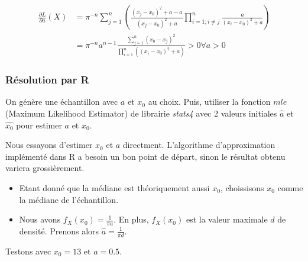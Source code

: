 \documentclass[12pt,a4paper,titlepage]{article}
\numberwithin{equation}{section}
\begin{document}
\begin{align*}
\frac{{\partial L}}{{\partial a}}\left( X \right) & = {\pi ^{ - n}}\sum\limits_{j = 1}^n {\left( {\frac{{{{\left( {{x_j} - {x_0}} \right)}^2} + a - a}}{{{{\left( {{x_j} - {x_0}} \right)}^2} + a}}\prod\limits_{i = 1;i \ne j}^n {\frac{a}{{{{\left( {{x_i} - {x_0}} \right)}^2} + a}}} } \right)}\\
&  = {\pi ^{ - n}}{a^{n - 1}}\frac{{\sum\limits_{j = 1}^n {{{\left( {{x_0} - {x_j}} \right)}^2}} }}{{\prod\limits_{i = 1}^n {\left( {{{\left( {{x_i} - {x_0}} \right)}^2} + a} \right)} }} > 0 \forall a > 0
\end{align*}

\subsubsection*{Résolution par R}

On génère une échantillon avec $a$ et $x_0$ au choix. Puis, utiliser la fonction $mle$ (Maximum Likelihood Estimator) de librairie \emph{stats4} avec 2 valeurs initiales $\hat{a}$ et $\hat{x_0}$ pour estimer $a$ et $x_0$.

Nous essayons d'estimer $x_0$ et $a$ directment. L'algorithme d'approximation implémenté dans R a besoin un bon point de départ, sinon le résultat obtenu variera grossièrement.
\begin{itemize}
\item Etant donné que la médiane est théoriquement aussi $x_0$, choissisons $x_0$ comme la médiane de l'échantillon.
\item Nous avons ${f_X}\left( {{x_0}} \right) = \frac{1}{{\pi a}}$. En plus, $f_X(x_0)$ est la valeur maximale $d$ de densité. Prenons alors $\hat a = \frac{1}{{\pi d}}$.
\end{itemize}

Testons avec $x_0=13$ et $a=0.5$.


\end{document}
